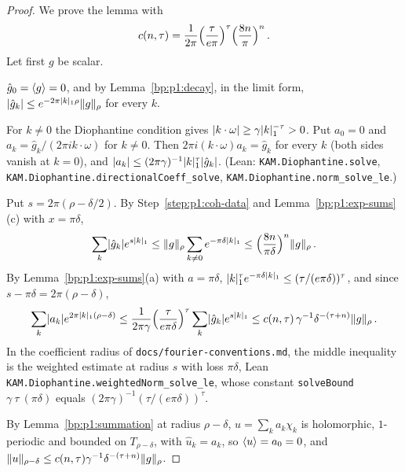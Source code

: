 \begin{proof}
We prove the lemma with
\begin{equation*}
c(n,\tau)=\frac1{2\pi}\Bigl(\frac{\tau}{e\pi}\Bigr)^\tau\Bigl(\frac{8n}{\pi}\Bigr)^n\,.
\end{equation*}
Let first $g$ be scalar.

\label{step:p1:coh-data}
$\hat g_0=\langle g\rangle=0$, and by Lemma~\ref{bp:p1:decay}, in the limit form,
$\lvert \hat g_k\rvert\le e^{-2\pi\lvert k\rvert_1\rho}\lVert g\rVert_\rho$ for every $k$.

\label{step:p1:coh-coefficients}
For $k\ne0$ the Diophantine condition gives $\lvert k\cdot\omega\rvert\ge\gamma\lvert k\rvert_1^{-\tau}>0$. Put $a_0=0$
and $a_k=\hat g_k/(2\pi ik\cdot\omega)$ for $k\ne0$. Then $2\pi i(k\cdot\omega)a_k=\hat g_k$ for every $k$
(both sides vanish at $k=0$), and $\lvert a_k\rvert\le(2\pi\gamma)^{-1}\lvert k\rvert_1^\tau\lvert \hat g_k\rvert$. (Lean:
\nolinkurl{KAM.Diophantine.solve}, \nolinkurl{KAM.Diophantine.directionalCoeff_solve},
\nolinkurl{KAM.Diophantine.norm_solve_le}.)

\label{step:p1:coh-weighted}
Put $s=2\pi(\rho-\delta/2)$. By Step~\ref{step:p1:coh-data} and Lemma~\ref{bp:p1:exp-sums}(c) with
$x=\pi\delta$,
\begin{equation*}
\sum_k\lvert \hat g_k\rvert e^{s\lvert k\rvert_1}\le\lVert g\rVert_\rho\sum_{k\ne0}e^{-\pi\delta\lvert k\rvert_1}
\le\Bigl(\frac{8n}{\pi\delta}\Bigr)^n\lVert g\rVert_\rho\,.
\end{equation*}
By Lemma~\ref{bp:p1:exp-sums}(a) with $a=\pi\delta$, $\lvert k\rvert_1^\tau e^{-\pi\delta\lvert k\rvert_1}\le
(\tau/(e\pi\delta))^\tau$, and since $s-\pi\delta=2\pi(\rho-\delta)$,
\begin{equation*}
\sum_k\lvert a_k\rvert e^{2\pi\lvert k\rvert_1(\rho-\delta)}\le\frac1{2\pi\gamma}\Bigl(\frac{\tau}{e\pi\delta}\Bigr)^\tau
\sum_k\lvert \hat g_k\rvert e^{s\lvert k\rvert_1}\le c(n,\tau)\,\gamma^{-1}\delta^{-(\tau+n)}\lVert g\rVert_\rho\,.
\end{equation*}
In the coefficient radius of \texttt{docs/fourier-conventions.md}, the middle inequality is the weighted
estimate at radius $s$ with loss $\pi\delta$, Lean \nolinkurl{KAM.Diophantine.weightedNorm_solve_le}, whose
constant \nolinkurl{solveBound} $\gamma\ \tau\ (\pi\delta)$ equals $(2\pi\gamma)^{-1}(\tau/(e\pi\delta))^\tau$.

\label{step:p1:coh-existence}
By Lemma~\ref{bp:p1:summation} at radius $\rho-\delta$, $u=\sum_ka_k\chi_k$ is holomorphic, $1$-periodic
and bounded on $T_{\rho-\delta}$, with $\hat u_k=a_k$, so $\langle u\rangle=a_0=0$, and
$\lVert u\rVert_{\rho-\delta}\le c(n,\tau)\gamma^{-1}\delta^{-(\tau+n)}\lVert g\rVert_\rho$.


\end{proof}
